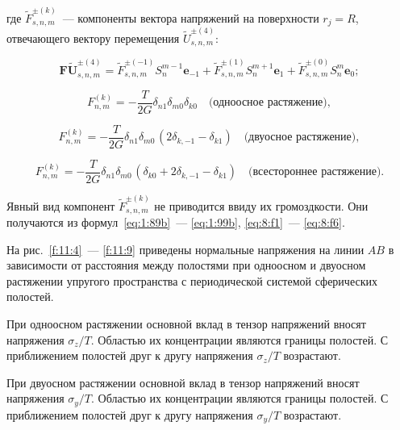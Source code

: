 \noindent где $\tilde F_{s,n,m}^{\pm(k)}$~--- компоненты вектора напряжений на поверхности $r_j=R$, отвечающего вектору перемещения $\tilde U_{s,n,m}^{\pm(4)}$:

$$
\mathbf{F\tilde U}_{s,n,m}^{\pm(4)}=\tilde F_{s,n,m}^{\pm(-1)}S_n^{m-1}\mathbf{e}_{-1}+\tilde F_{s,n,m}^{\pm(1)}S_n^{m+1}\mathbf{e}_1+\tilde F_{s,n,m}^{\pm(0)}S_n^m\mathbf{e}_0;
$$

\begin{equation*}
F_{n,m}^{(k)} =  -\frac{T}{2G}{\delta _{n1}}{\delta _{m0}}{\delta _{k0}}\quad\text{(одноосное растяжение)},
\label{eq:11:19}
\end{equation*}

\begin{equation*}
F_{n,m}^{(k)} =  -\frac{T}{2G}{\delta _{n1}}{\delta _{m0\,}}(2{\delta _{k, - 1}} - {\delta _{k1}})\quad\text{(двуосное растяжение)},
\label{eq:11:20}
\end{equation*}

\begin{equation*}
F_{n,m}^{(k)} =  -\frac{T}{2G}{\delta _{n1}}{\delta _{m0\,}}(\delta_{k0}+2{\delta _{k, - 1}} - {\delta _{k1}})\quad\text{(всестороннее растяжение)}.
\label{eq:11:21}
\end{equation*}

Явный вид компонент $\tilde F_{s,n,m}^{\pm(k)}$ не приводится ввиду их громоздкости. Они получаются из формул~\eqref{eq:1:89b}~--- \eqref{eq:1:99b}, \eqref{eq:8:f1}~--- \eqref{eq:8:f6}.

На рис.~\ref{f:11:4}~--- \ref{f:11:9} приведены нормальные напряжения на линии $AB$ в зависимости от расстояния между полостями при одноосном и двуосном растяжении упругого пространства с периодической системой сферических полостей.

При одноосном растяжении основной вклад в тензор напряжений вносят напряжения $\sigma_z/T$. Областью их концентрации являются границы полостей. С приближением полостей друг к другу напряжения $\sigma_z/T$ возрастают.

При двуосном растяжении основной вклад в тензор напряжений вносят напряжения $\sigma_y/T$. Областью их концентрации являются границы полостей. С приближением полостей друг к другу напряжения $\sigma_y/T$ возрастают.

